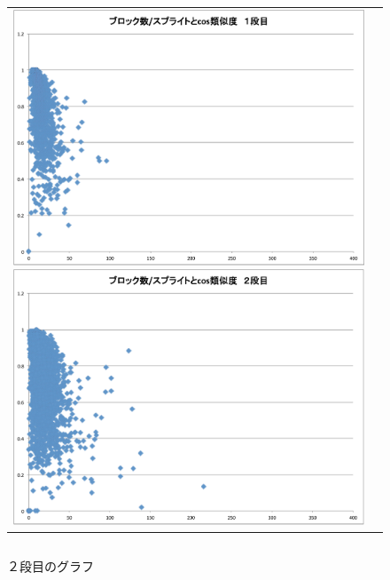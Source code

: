 \documentclass[a4paper,10pt,onecolumn,oneside,openany]{jsbook}
\begin{document}
\begin{figure}[h]
 \begin{tabular}{cc}
 	\begin{minipage}[t]{0.45\hsize}
	 \centering
	 \includegraphics[keepaspectratio, scale = 0.25]{block_per_splite_1.pdf}
	 \caption{１段目のグラフ}
	 \label{first_block_per_splite}
	\end{minipage}
        \begin{minipage}[t]{0.45\hsize}
	 \centering
	 \includegraphics[keepaspectratio, scale = 0.25]{block_per_splite_2.pdf}
	 \caption{２段目のグラフ}
	 \label{second_block_per_splite}
	\end{minipage}
 \end{tabular}
  \begin{tabular}{cc}

\end{tabular}
\end{figure}
\end{document}
